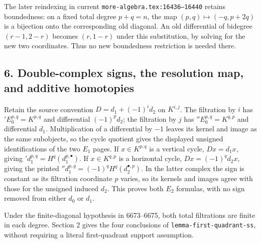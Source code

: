\documentclass[11pt]{article}
\begin{document}
The later reindexing in current \texttt{more-algebra.tex:16436–16440} retains boundedness: on a fixed total degree \(p+q=n\), the map \((p,q)\mapsto(-q,p+2q)\) is a bijection onto the corresponding old diagonal. An old differential of bidegree \((r-1,2-r)\) becomes \((r,1-r)\) under this substitution, by solving for the new two coordinates. Thus no new boundedness restriction is needed there.

\subsection{6. Double-complex signs, the resolution map, and additive homotopies}\label{note-07-double-complex-signs-the-resolution-map-and-additive-homotopies}

Retain the source convention \(D=d_1+(-1)^i d_2\) on \(K^{i,j}\). The filtration by \(i\) has \({}'E_0^{p,q}=K^{p,q}\) and differential \((-1)^pd_2\); the filtration by \(j\) has \({}''E_0^{p,q}=K^{q,p}\) and differential \(d_1\). Multiplication of a differential by \(-1\) leaves its kernel and image as the same subobjects, so the cycle quotient gives the displayed unsigned identifications of the two \(E_1\) pages. If \(x\in K^{p,q}\) is a vertical cycle, \(Dx=d_1x\), giving \({}'d_1^{p,q}=H^q(d_1^{p,\bullet})\). If \(x\in K^{q,p}\) is a horizontal cycle, \(Dx=(-1)^qd_2x\), giving the printed \({}''d_1^{p,q}=(-1)^qH^q(d_2^{\bullet,p})\). In the latter complex the sign is constant as its filtration coordinate \(p\) varies, so its kernels and images agree with those for the unsigned induced \(d_2\). This proves both \(E_2\) formulas, with no sign removed from either \(d_0\) or \(d_1\).

Under the finite-diagonal hypothesis in 6673--6675, both total filtrations are finite in each degree. Section 2 gives the four conclusions of \texttt{lemma-first-quadrant-ss}, without requiring a literal first-quadrant support assumption.
\end{document}
